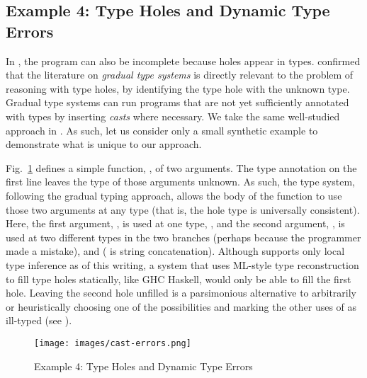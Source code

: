 
\subsection{Example 4: Type Holes and Dynamic Type Errors}
\label{sec:dynamic-type-errors}



In \Hazel, the program can also be incomplete because holes appear in types. 
\citet{popl-paper} confirmed that the literature on \emph{gradual type systems} \cite{Siek06a,DBLP:conf/snapl/SiekVCB15} is directly relevant to the problem of reasoning with type holes, by identifying the type hole with the unknown type. 
Gradual type systems can run programs that are not yet sufficiently annotated with types by inserting \emph{casts}  where necessary. We take the same well-studied approach in \Hazel. As such, let us consider only a small synthetic example to demonstrate what is unique to our approach.

Fig.~\ref{fig:cast-errors} defines a simple function, , of two arguments. 
The type annotation on the first line leaves the type of those arguments unknown. 
As such, the \Hazel type system, following the gradual typing approach,
allows the body of the function to use those two
arguments at any type (that is, the hole type is universally consistent). 
Here, the first argument, , is used at one type, , 
and the second argument, , is used at two different types in the two branches (perhaps because the programmer made a mistake), 
  and    ( \li{^} is string concatenation).
Although \Hazel supports only local type inference as of this writing, 
a system that uses ML-style type reconstruction to fill type holes statically, like GHC Haskell, would only be able to fill the first hole. Leaving the second hole unfilled is 
a parsimonious alternative to arbitrarily or heuristically choosing one of the possibilities and marking the
other uses of  as ill-typed (see \cite{DBLP:journals/jfp/ChenE18}).


\begin{figure}
\centering
\texttt{[image: images/cast-errors.png]}
\caption{Example 4: Type Holes and Dynamic Type Errors}
\label{fig:cast-errors}
\vspace{-6px}
\end{figure}

